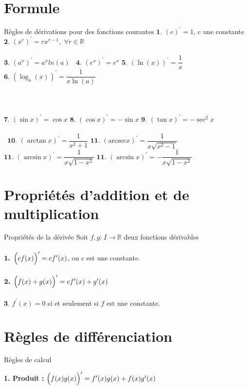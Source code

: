 \documentclass{report}
\begin{document}
\begin{multicols*}{3}
\section{Formule}
\begin{Concept}{Règles de dérivations pour des fonctions courantes}{}
  $ \textbf{1. }   (c)^{\prime} = 1$, c une constante \;\;
  $ \textbf{2. }   (x^r)^{\prime} = rx^{r -1}, \; \forall r \in \mathbb{R}$ \\\\
  $ \textbf{3. }   (a^x)^{\prime} = a^xln(a)\;\;$ 
  $ \textbf{4. }   (e^x)^{\prime} = e^x$ \;\; 
  $ \textbf{5. }   (\ln(x))^{\prime} = \dfrac{1}{x} $ \;\; 
  $ \textbf{6. }   (\log_a(x))^{\prime} = \dfrac{1}{x\ln(a)}$ \\\\\\\\
  $ \textbf{7. }   (\sin x)^{\prime} = \cos x$ \;\; 
  $ \textbf{8. }   (\cos x)^{\prime} = - \sin x$ \;\;
  $ \textbf{9. }   (\tan x)^{\prime} = -\sec^2 x$ \\\\\
  $ \textbf{10. }   (\arctan x)^{\prime} = \dfrac{1}{x^2 +1}$ \;\;
  $ \textbf{11. }   (\text{arcsec}x)^{\prime} = \dfrac{1}{x\sqrt{x^2 -1}}$ \;\;
  $ \textbf{11. }   (\arcsin x)^{\prime} = \dfrac{1}{x\sqrt{1 - x^2}}$ \;\;
  $ \textbf{11. }   (\arcsin x)^{\prime} = -\dfrac{1}{x\sqrt{1 - x^2}}$ \;\;

\end{Concept}

\section{Propriétés d'addition et de multiplication}
\begin{Concept}{Propriétés de la dérivée}{}
  Soit $f, g \text{:} \; I \rightarrow \mathbb{R}$ deux fonctions dérivables \\\\
  $\textbf{1. } \Bigl(cf(x)\Bigr)^{\prime} = cf^{\prime}(x)$, ou c est une constante. \\\\
  $\textbf{2. } \Bigl(f(x) + g(x)\Bigr)^{\prime} = cf^{\prime}(x) +  g^{\prime}(x)$ \\\\
  $\textbf{3. } f^{\prime}(x) = 0$ si et seulement si $f$ est une constante. 
\end{Concept}



\section{Règles de différenciation}
\begin{Concept}{Règles de calcul}{}
\begin{adjustbox}{width=1\textwidth}
\textbf{1. Produit :}
  $\Bigl(f(x)g(x)\Bigr)^{\prime} = f^{\prime}(x)g(x) + f(x)g^{\prime}(x)$
\end{adjustbox}


\end{Concept}
\end{multicols*}
\end{document}
